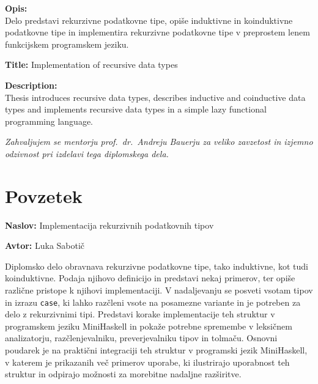\documentclass[a4paper,12pt,openright]{book}
\newcommand{\ttitle}{Implementacija rekurzivnih podatkovnih tipov}
\newcommand{\tauthor}{Luka Sabotič}
\newcommand{\clearemptydoublepage}{\newpage{\pagestyle{empty}\cleardoublepage}}
\begin{document}
\bigskip
\noindent\textbf{Opis:}\\
Delo predstavi rekurzivne podatkovne tipe, opiše induktivne in koinduktivne podatkovne tipe in implementira rekurzivne podatkovne tipe v preprostem lenem funkcijskem programskem jeziku.

\bigskip
\noindent\textbf{Title:} Implementation of recursive data types

\bigskip
\noindent\textbf{Description:}\\
Thesis introduces recursive data types, describes inductive and coinductive data types and implements recursive data types in a simple lazy functional programming language.

\vfill



\vspace{2cm}

\clearemptydoublepage

\thispagestyle{empty}\mbox{}\vfill\null\it%
\noindent
Zahvaljujem se mentorju prof.\ dr.\ Andreju Bauerju za veliko zavzetost in izjemno odzivnost pri izdelavi tega diplomskega dela.
\rm\normalfont

\clearemptydoublepage

\thispagestyle{empty}\mbox{}{\textheight}\mbox{}\hfill\begin{minipage}{0.55\textwidth}%
\normalfont\end{minipage}

\clearemptydoublepage


\pagestyle{empty}
\def\thepage{}%
\tableofcontents{}


\clearemptydoublepage


{}
\chapter*{Povzetek}

\noindent\textbf{Naslov:} \ttitle
\bigskip

\noindent\textbf{Avtor:} \tauthor
\bigskip

\noindent Diplomsko delo obravnava rekurzivne podatkovne tipe, tako induktivne, kot tudi koinduktivne. Podaja njihovo definicijo in predstavi nekaj 
primerov, ter opiše različne pristope k njihovi implementaciji. V nadaljevanju se posveti vsotam tipov in izrazu \lstinline{case}, ki lahko razčleni 
vsote na posamezne variante in je potreben za delo z rekurzivnimi tipi. Predstavi korake implementacije teh struktur v programskem jeziku 
MiniHaskell in pokaže potrebne spremembe v leksičnem analizatorju, razčlenjevalniku, preverjevalniku tipov in tolmaču. Osnovni poudarek je 
na praktični integraciji teh struktur v programski jezik MiniHaskell, v katerem je prikazanih več primerov uporabe, ki ilustrirajo uporabnost 
teh struktur in odpirajo možnosti za morebitne nadaljne razširitve.
\end{document}
